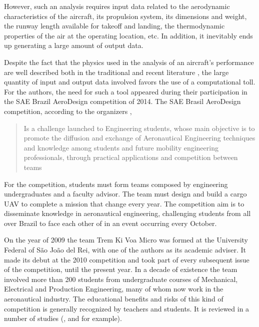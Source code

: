 \documentclass[10pt]{SelfArx} %
\begin{document}
However, such an analysis requires input data related to the aerodynamic characteristics of the aircraft, its propulsion system, its dimensions and weight, the runway length available for takeoff and landing,  the thermodynamic properties  of the air at the operating location, etc. In addition, it inevitably ends up generating a large amount of output data.

Despite the fact that the physics used in the analysis of an aircraft's performance are well described both in the traditional and recent  literature \cite{anderson, anderson2, roskam, pellegrini_rodrigues},  the large quantity of input and output data involved favors  the use of a computational toll. For the  authors, the need for such a tool appeared during their participation in the SAE Brazil AeroDesign competition of 2014.  
The SAE Brasil AeroDesign competition, according to the organizers \cite{sae}, 
\begin{quote}
Is a challenge launched to Engineering students, whose main objective is to promote the diffusion and exchange of Aeronautical Engineering techniques and knowledge among students and future mobility engineering professionals, through practical applications and competition between teams
\end{quote}

For the competition, students must form teams composed by engineering undergraduates and a faculty advisor. The team must  design and build a cargo UAV to complete a mission that change every year. The competition aim is to disseminate knowledge in aeronautical engineering,  challenging students from all over Brazil to face each other of in an event occurring every October. 

On the year of 2009 the team Trem Ki Voa Micro was formed at the University Federal of São João del Rei, with one of the authors as its academic adviser. It made its debut at the 2010 competition and took part of every subsequent issue of the competition, until the present year. In a decade of existence the team involved more than 200 students from undergraduate courses of Mechanical, Electrical and Production Engineering,  many of whom now work in the aeronautical industry. The educational benefits and risks of this kind of competition is generally recognized by teachers and students. It is  reviewed in a number of studies (\cite{kaiser}, \cite{gadola} and \cite{schuster}for example).
\end{document}
